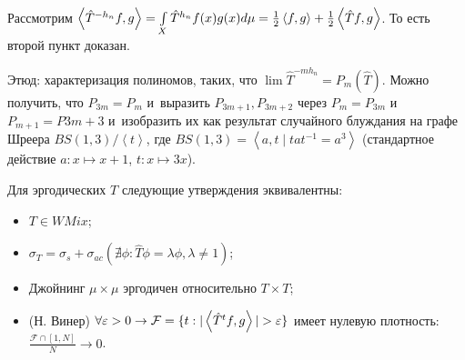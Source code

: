 \documentclass{article}
\begin{document}
Рассмотрим $\left< \hat T^{-h_n}f, g\right> = \int\limits_X
\hat T^{h_n} f(x)g(x) d\mu = {1\over2} \left<f,g\right> +
{1\over2} \left<\hat Tf, g\right>$. То есть второй пункт доказан.

Этюд: характеризация полиномов, таких, что $\lim \hat T^{-mh_n} = P_m(\hat T)$.
Можно получить, что $P_{3m} = P_m$ и~выразить $P_{3m+1}, P_{3m+2}$ через
$P_{m}=P_{3m}$ и~$P_{m+1}=P{3m+3}$ и~изобразить их как результат случайного
блуждания на графе Шреера $BS(1,3) / \left<t\right>$, где $BS(1,3)=\left<a,t\mid
tat^{-1} = a^3\right>$ (стандартное действие $a: x \mapsto x + 1$, $t: x \mapsto
3x$).

\begin{theorem}
	Для эргодических $T$ следующие утверждения эквивалентны:
	\begin{itemize}
		\item $T \in WMix$;
		\item $\sigma_T = \sigma_s + \sigma_{ac} (\nexists \phi: \hat T\phi =
			\lambda \phi, \lambda \ne 1)$;
		\item Джойнинг $\mu \times \mu$ эргодичен относительно $T \times T$;
		\item (Н. Винер) $\forall \varepsilon > 0 \rightarrow \mathcal F = \{t:
			|\left<\hat T^t f, g\right>| > \varepsilon \}$ имеет нулевую плотность:
			$\frac{\mathcal{F} \cap [1, N]}{N} \rightarrow 0$.
	\end{itemize}
\end{theorem}
\end{document}
